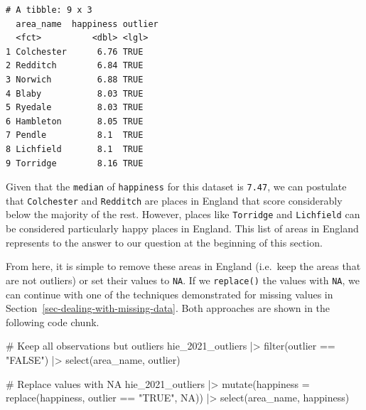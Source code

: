 \documentclass[
  letterpaper,
]{krantz}
\makeatletter
\newenvironment{Shaded}{\begin{snugshade}}{\end{snugshade}}
\newcommand{\AttributeTok}[1]{\textcolor[rgb]{0.40,0.45,0.13}{#1}}
\newcommand{\CommentTok}[1]{\textcolor[rgb]{0.37,0.37,0.37}{#1}}
\newcommand{\ConstantTok}[1]{\textcolor[rgb]{0.56,0.35,0.01}{#1}}
\newcommand{\FunctionTok}[1]{\textcolor[rgb]{0.28,0.35,0.67}{#1}}
\newcommand{\NormalTok}[1]{\textcolor[rgb]{0.00,0.23,0.31}{#1}}
\newcommand{\SpecialCharTok}[1]{\textcolor[rgb]{0.37,0.37,0.37}{#1}}
\newcommand{\StringTok}[1]{\textcolor[rgb]{0.13,0.47,0.30}{#1}}
\newenvironment{kframe}{%
\medskip{}
\setlength{\fboxsep}{.8em}
 \def\at@end@of@kframe{}%
 \ifinner\ifhmode%
  \def\at@end@of@kframe{\end{minipage}}%
  \begin{minipage}{\columnwidth}%
 \fi\fi%
 \def\FrameCommand##1{\hskip\@totalleftmargin \hskip-\fboxsep
 \colorbox{shadecolor}{##1}\hskip-\fboxsep
     \hskip-\linewidth \hskip-\@totalleftmargin \hskip\columnwidth}%
 \MakeFramed {\advance\hsize-\width
   \@totalleftmargin\z@ \linewidth\hsize
   \@setminipage}}%
 {\par\unskip\endMakeFramed%
 \at@end@of@kframe}
\renewenvironment{Shaded}{\begin{kframe}}{\end{kframe}}
\makeatother
\begin{document}
\begin{verbatim}
# A tibble: 9 x 3
  area_name  happiness outlier
  <fct>          <dbl> <lgl>  
1 Colchester      6.76 TRUE   
2 Redditch        6.84 TRUE   
3 Norwich         6.88 TRUE   
4 Blaby           8.03 TRUE   
5 Ryedale         8.03 TRUE   
6 Hambleton       8.05 TRUE   
7 Pendle          8.1  TRUE   
8 Lichfield       8.1  TRUE   
9 Torridge        8.16 TRUE   
\end{verbatim}

Given that the \texttt{median} of \texttt{happiness} for this dataset is
\texttt{7.47}, we can postulate that \texttt{Colchester} and
\texttt{Redditch} are places in England that score considerably below
the majority of the rest. However, places like \texttt{Torridge} and
\texttt{Lichfield} can be considered particularly happy places in
England. This list of areas in England represents to the answer to our
question at the beginning of this section.

From here, it is simple to remove these areas in England (i.e.~keep the
areas that are not outliers) or set their values to \texttt{NA}. If we
\texttt{replace()} the values with \texttt{NA}, we can continue with one
of the techniques demonstrated for missing values in
Section~\ref{sec-dealing-with-missing-data}. Both approaches are shown
in the following code chunk.

\begin{Shaded}
\begin{Highlighting}[]
\CommentTok{\# Keep all observations but outliers}
\NormalTok{hie\_2021\_outliers }\SpecialCharTok{|\textgreater{}}
  \FunctionTok{filter}\NormalTok{(outlier }\SpecialCharTok{==} \StringTok{"FALSE"}\NormalTok{) }\SpecialCharTok{|\textgreater{}}
  \FunctionTok{select}\NormalTok{(area\_name, outlier)}
\end{Highlighting}
\end{Shaded}

\begin{Shaded}
\begin{Highlighting}[]
\CommentTok{\# Replace values with NA}
\NormalTok{hie\_2021\_outliers }\SpecialCharTok{|\textgreater{}}
  \FunctionTok{mutate}\NormalTok{(}\AttributeTok{happiness =} \FunctionTok{replace}\NormalTok{(happiness, outlier }\SpecialCharTok{==} \StringTok{"TRUE"}\NormalTok{, }\ConstantTok{NA}\NormalTok{)) }\SpecialCharTok{|\textgreater{}}
  \FunctionTok{select}\NormalTok{(area\_name, happiness)}
\end{Highlighting}
\end{Shaded}
\end{document}
